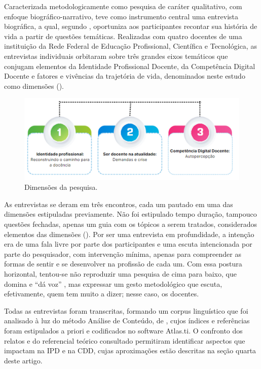 \documentclass[portuguese]{textolivre}
\begin{document}
Caracterizada metodologicamente como pesquisa de caráter qualitativo, com enfoque biográfico-narrativo, teve como instrumento central uma entrevista biográfica, a qual, segundo \textcite{bolivar1998}, oportuniza aos participantes recontar sua história de vida a partir de questões temáticas. Realizadas com quatro docentes de uma instituição da Rede Federal de Educação Profissional, Científica e Tecnológica, as entrevistas individuais orbitaram sobre três grandes eixos temáticos que conjugam elementos da Identidade Profissional Docente, da Competência Digital Docente e fatores e vivências da trajetória de vida, denominados neste estudo como dimensões ().

\begin{figure}
    \centering
    \begin{minipage}{.75\textwidth}
    \includegraphics[width=\linewidth]{Figura1.png}
    \caption{Dimensões da pesquisa.}
    \label{fig1}
    \end{minipage}
\end{figure}

As entrevistas se deram em três encontros, cada um pautado em uma das dimensões estipuladas previamente. Não foi estipulado tempo duração, tampouco questões fechadas, apenas um guia com os tópicos a serem tratados, considerados elementos das dimensões (). Por ser uma entrevista em profundidade, a intenção era de uma fala livre por parte dos participantes e uma escuta intencionada por parte do pesquisador, com intervenção mínima, apenas para compreender as formas de sentir e se desenvolver na profissão de cada um. Com essa postura horizontal, tentou-se não reproduzir uma pesquisa de cima para baixo, que domina e “dá voz” \cite{vazquezrecio2022}, mas expressar um gesto metodológico que escuta, efetivamente, quem tem muito a dizer; nesse caso, os docentes. 

Todas as entrevistas foram transcritas, formando um corpus linguístico que foi analisado à luz do método Análise de Conteúdo, de \textcite{bardin2016}, cujos índices e referências foram estipulados a priori e codificados no software Atlas.ti. O confronto dos relatos e do referencial teórico consultado permitiram identificar aspectos que impactam na IPD e na CDD, cujas aproximações estão descritas na seção quarta deste artigo.
\end{document}
